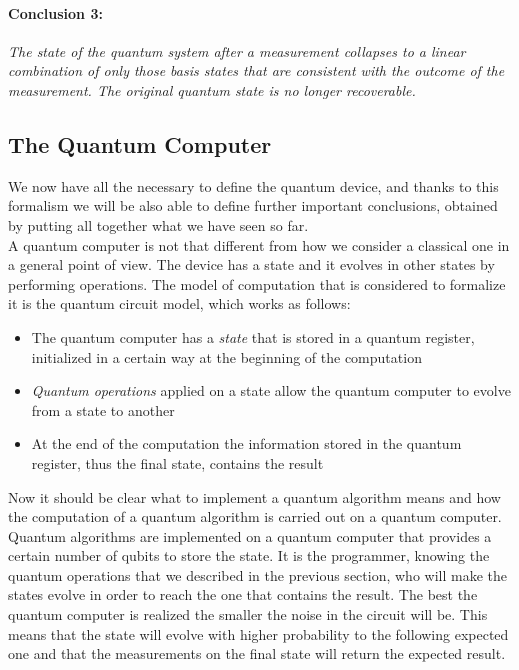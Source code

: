 \documentclass[english]{article}
\begin{document}
			\paragraph{Conclusion 3:} \emph{The state of the quantum system after a measurement collapses to a linear combination of only those basis states that are consistent with the outcome of the measurement. The original quantum state is no longer recoverable.}	
				
		\subsection{The Quantum Computer}
		\label{sec:quantumComputer}
			We now have all the necessary to define the quantum device, and thanks to this formalism we will be also able to define further important conclusions, obtained by putting all together what we have seen so far. \\
			
			A quantum computer is not that different from how we consider a classical one in a general point of view. The device has a state and it evolves in other states by performing operations. The model of computation that is considered to formalize it is the quantum circuit model, which works as follows:
			
			\begin{itemize}
				\item The quantum computer has a \emph{state} that is stored in a quantum register, initialized in a certain way at the beginning of the computation
				
				\item \emph{Quantum operations} applied on a state allow the quantum computer to evolve from a state to another
				
				\item At the end of the computation the information stored in the quantum register, thus the final state, contains the result
			\end{itemize}
		
			Now it should be clear what to implement a quantum algorithm means and how the computation of a quantum algorithm is carried out on a quantum computer. Quantum algorithms are implemented on a quantum computer that provides a certain number of qubits to store the state. It is the programmer, knowing the quantum operations that we described in the previous section, who will make the states evolve in order to reach the one that contains the result. The best the quantum computer is realized the smaller the noise in the circuit will be. This means that the state will evolve with higher probability to the following expected one and that the measurements on the final state will return the expected result. \\
			
\end{document}
